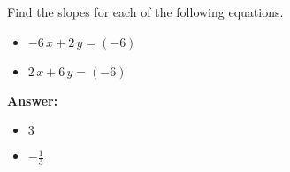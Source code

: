  Find the slopes for each of the following equations. \begin{itemize}\item \( -6 \, x + 2 \, y = \left(-6\right) \)\item \( 2 \, x + 6 \, y = \left(-6\right) \)\end{itemize}

        \textbf{Answer:} \begin{itemize}\item \( 3 \)\item \( -\frac{1}{3} \)\end{itemize}
